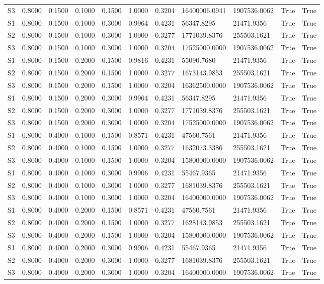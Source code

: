 \documentclass[11pt,a4paper]{article}
\begin{document}
\begin{landscape}
{\begin{longtable}{lllllllllll}
S3 & 0.8000 & 0.1500 & 0.1000 & 0.1500 & 1.0000 & 0.3204 & 16400006.0941 & 1907536.0062 & True & True \\
S1 & 0.8000 & 0.1500 & 0.1000 & 0.3000 & 0.9964 & 0.4231 & 56347.8295 & 21471.9356 & True & True \\
S2 & 0.8000 & 0.1500 & 0.1000 & 0.3000 & 1.0000 & 0.3277 & 1771039.8376 & 255503.1621 & True & True \\
S3 & 0.8000 & 0.1500 & 0.1000 & 0.3000 & 1.0000 & 0.3204 & 17525000.0000 & 1907536.0062 & True & True \\
S1 & 0.8000 & 0.1500 & 0.2000 & 0.1500 & 0.9816 & 0.4231 & 55090.7680 & 21471.9356 & True & True \\
S2 & 0.8000 & 0.1500 & 0.2000 & 0.1500 & 1.0000 & 0.3277 & 1673143.9853 & 255503.1621 & True & True \\
S3 & 0.8000 & 0.1500 & 0.2000 & 0.1500 & 1.0000 & 0.3204 & 16362500.0000 & 1907536.0062 & True & True \\
S1 & 0.8000 & 0.1500 & 0.2000 & 0.3000 & 0.9964 & 0.4231 & 56347.8295 & 21471.9356 & True & True \\
S2 & 0.8000 & 0.1500 & 0.2000 & 0.3000 & 1.0000 & 0.3277 & 1771039.8376 & 255503.1621 & True & True \\
S3 & 0.8000 & 0.1500 & 0.2000 & 0.3000 & 1.0000 & 0.3204 & 17525000.0000 & 1907536.0062 & True & True \\
S1 & 0.8000 & 0.4000 & 0.1000 & 0.1500 & 0.8571 & 0.4231 & 47560.7561 & 21471.9356 & True & True \\
S2 & 0.8000 & 0.4000 & 0.1000 & 0.1500 & 1.0000 & 0.3277 & 1632073.3386 & 255503.1621 & True & True \\
S3 & 0.8000 & 0.4000 & 0.1000 & 0.1500 & 1.0000 & 0.3204 & 15800000.0000 & 1907536.0062 & True & True \\
S1 & 0.8000 & 0.4000 & 0.1000 & 0.3000 & 0.9906 & 0.4231 & 55467.9365 & 21471.9356 & True & True \\
S2 & 0.8000 & 0.4000 & 0.1000 & 0.3000 & 1.0000 & 0.3277 & 1681039.8376 & 255503.1621 & True & True \\
S3 & 0.8000 & 0.4000 & 0.1000 & 0.3000 & 1.0000 & 0.3204 & 16400000.0000 & 1907536.0062 & True & True \\
S1 & 0.8000 & 0.4000 & 0.2000 & 0.1500 & 0.8571 & 0.4231 & 47560.7561 & 21471.9356 & True & True \\
S2 & 0.8000 & 0.4000 & 0.2000 & 0.1500 & 1.0000 & 0.3277 & 1628143.9853 & 255503.1621 & True & True \\
S3 & 0.8000 & 0.4000 & 0.2000 & 0.1500 & 1.0000 & 0.3204 & 15800000.0000 & 1907536.0062 & True & True \\
S1 & 0.8000 & 0.4000 & 0.2000 & 0.3000 & 0.9906 & 0.4231 & 55467.9365 & 21471.9356 & True & True \\
S2 & 0.8000 & 0.4000 & 0.2000 & 0.3000 & 1.0000 & 0.3277 & 1681039.8376 & 255503.1621 & True & True \\
S3 & 0.8000 & 0.4000 & 0.2000 & 0.3000 & 1.0000 & 0.3204 & 16400000.0000 & 1907536.0062 & True & True \\
\end{longtable}

}
\end{landscape}

\clearpage
\end{document}
